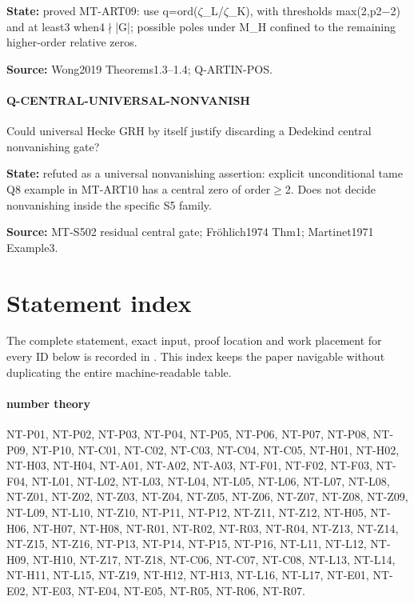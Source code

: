 \documentclass[11pt,a4paper]{article}
\begin{document}
\textbf{State:} proved MT-ART09:\allowbreak{} use q=ord(\ensuremath{\zeta}\_\allowbreak{}L/\allowbreak{}\ensuremath{\zeta}\_\allowbreak{}K), with thresholds max(2,p2\ensuremath{-}2) and at least3 when4\ensuremath{\nmid}|G|; possible poles under M\_\allowbreak{}H confined to the remaining higher-order relative zeros.\allowbreak{}

\textbf{Source:} Wong2019 Theorems1.\allowbreak{}3–\allowbreak{}1.\allowbreak{}4; Q-ARTIN-POS.

\paragraph{Q-CENTRAL-UNIVERSAL-NONVANISH} Could universal Hecke GRH by itself justify discarding a Dedekind central nonvanishing gate?

\textbf{State:} refuted as a universal nonvanishing assertion:\allowbreak{} explicit unconditional tame Q8 example in MT-ART10 has a central zero of order\ensuremath{\ge}2.\allowbreak{} Does not decide nonvanishing inside the specific S5 family.\allowbreak{}

\textbf{Source:} MT-S502 residual central gate; Fröhlich1974 Thm1; Martinet1971 Example3.
\section*{Statement index}
The complete statement, exact input, proof location and work placement for
every ID below is recorded in . This index keeps
the paper navigable without duplicating the entire machine-readable table.
\paragraph{number theory} NT-P01, NT-P02, NT-P03, NT-P04, NT-P05, NT-P06, NT-P07, NT-P08, NT-P09, NT-P10, NT-C01, NT-C02, NT-C03, NT-C04, NT-C05, NT-H01, NT-H02, NT-H03, NT-H04, NT-A01, NT-A02, NT-A03, NT-F01, NT-F02, NT-F03, NT-F04, NT-L01, NT-L02, NT-L03, NT-L04, NT-L05, NT-L06, NT-L07, NT-L08, NT-Z01, NT-Z02, NT-Z03, NT-Z04, NT-Z05, NT-Z06, NT-Z07, NT-Z08, NT-Z09, NT-L09, NT-L10, NT-Z10, NT-P11, NT-P12, NT-Z11, NT-Z12, NT-H05, NT-H06, NT-H07, NT-H08, NT-R01, NT-R02, NT-R03, NT-R04, NT-Z13, NT-Z14, NT-Z15, NT-Z16, NT-P13, NT-P14, NT-P15, NT-P16, NT-L11, NT-L12, NT-H09, NT-H10, NT-Z17, NT-Z18, NT-C06, NT-C07, NT-C08, NT-L13, NT-L14, NT-H11, NT-L15, NT-Z19, NT-H12, NT-H13, NT-L16, NT-L17, NT-E01, NT-E02, NT-E03, NT-E04, NT-E05, NT-R05, NT-R06, NT-R07.
\end{document}
